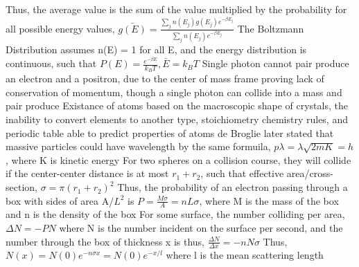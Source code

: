 \documentclass[11 pt, twoside]{article}
\newenvironment{outline*}
{
	\begin{outline}[enumerate]
	}
	{\end{outline}
}
\begin{document}
\begin{outline*}
	\2 Thus, the average value is the sum of the value multiplied by the probability for all possible energy values, $\bar{g(E)} = \frac{\sum_j n(E_j)g(E_j)e^{-\beta E_j}}{\sum_j n(E_j)e^{-\beta E_j}}$
	\2 The Boltzmann Distribution assumes n(E) = 1 for all E, and the energy distribution is continuous, such that $P(E) = \frac{e^{-\beta E}}{k_BT}, \bar{E} = k_BT$
\1 Single photon cannot pair produce an electron and a positron, due to the center of mass frame proving lack of conservation of momentum, though a single photon can collide into a mass and pair produce
\1 Existance of atoms based on the macroscopic shape of crystals, the inability to convert elements to another type, stoichiometry chemistry rules, and periodic table able to predict properties of atoms
\1 de Broglie later stated that massive particles could have wavelength by the same formuila, $p\lambda = \lambda \sqrt{2mK} = h$, where K is kinetic energy
\1 For two spheres on a collision course, they will collide if the center-center distance is at most $r_1 + r_2$, such that effective area/cross-section, $\sigma = \pi (r_1 + r_2)^2$
	\2 Thus, the probability of an electron passing through a box with sides of area A/$L^2$ is $P = \frac{M\sigma}{A} = nL\sigma$, where M is the mass of the box and n is the density of the box
	\2 For some surface, the number colliding per area, $\Delta N = -PN$ where N is the number incident on the surface per second, and the number through the box of thickness x is thus, $\frac{\Delta N}{\Delta x} = -nN\sigma$
	\2 Thus, $N(x) = N(0)e^{-n\sigma x} = N(0)e^{-x/l}$ where l is the mean scattering length
\end{outline*}
\end{document}
